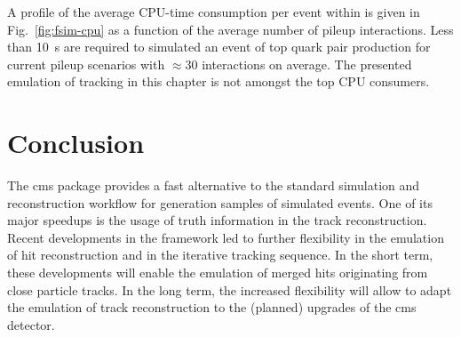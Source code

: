 A profile of the average CPU-time consumption per event within \FSIM is given in Fig.~\ref{fig:fsim-cpu} as a function of the average number of pileup interactions. Less than 10~s are required to simulated an event of top quark pair production for current pileup scenarios with $\approx30$ interactions on average. The presented emulation of tracking in this chapter is not amongst the top CPU consumers.



\section{Conclusion}
\label{sec:fsim-conclusion}

The \gls{cms} \FSIM package provides a fast alternative to the standard simulation and reconstruction workflow for generation samples of simulated events. One of its major speedups is the usage of truth information in the track reconstruction. Recent developments in the framework led to further flexibility in the emulation of hit reconstruction and in the iterative tracking sequence. In the short term, these developments will enable the emulation of merged hits originating from close particle tracks. In the long term, the increased flexibility will allow to adapt the emulation of track reconstruction to the (planned) upgrades of the \gls{cms} detector.



